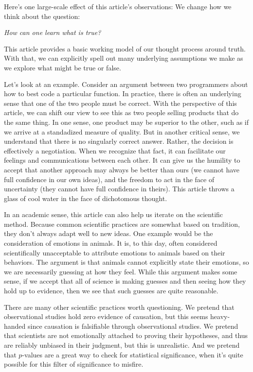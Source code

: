 \documentclass[11pt, oneside]{article}
\theoremstyle{argtstyle}
\begin{document}
Here's one large-scale effect of this article's observations:
We change how we think about the question:

\medskip
\centerline{\em How can one learn what is true?}
\medskip

This article provides a basic working model of our thought process around truth.
With that, we can explicitly spell out many underlying assumptions we
make as we explore what might be true or false.

Let's look at an example. 
Consider an argument between two programmers about how to best code a
particular function.
In practice, there is often an underlying sense that one
of the two people must be correct.
With the perspective of this article, we can
shift our view to see this as two people selling products that do the same
thing.
In one sense, one product may be superior to the other, such as if we
arrive at a standadized measure of quality.
But in another critical
sense, we understand that there is no singularly correct answer.
Rather, the decision is effectively a negotiation.
When we recognize that fact, it
can facilitate our feelings and communications between each other.
It can give
us the humility to accept that another approach may always be better than ours
(we cannot have full confidence in our own ideas),
and the freedom to act in the face of
uncertainty
(they cannot have full confidence in theirs).
This
article throws
a glass of cool water in the face of dichotomous thought.

In an academic sense, this article can also help us iterate on the scientific
method.
Because common scientific practices are somewhat based on tradition,
they don't
always adapt well to new ideas.
One example would be the consideration of emotions in animals.
It is, to this day, often considered scientifically unacceptable to attribute
emotions to animals based on their behaviors. The argument is that animals
cannot explicitly state their emotions, so we are necessarily guessing at how
they feel. While this argument makes some sense, if we accept that all of
science is making guesses and then seeing how they hold up to evidence, then we
see that such guesses are quite reasonable.

There are many other scientific practices worth questioning.
We pretend that observational studies hold zero evidence of causation, but this
seems heavy-handed since causation is falsifiable through observational
studies. We pretend that scientists are not emotionally attached to proving
their hypotheses, and thus are reliably unbiased in their judgment, but this is
unrealistic. And we pretend that $p$-values are a great way to check for
statistical significance, when it's quite possible for this filter of
significance to misfire.
\end{document}
